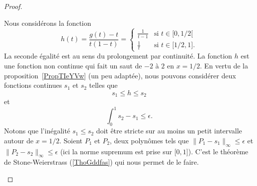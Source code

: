\begin{proof}
\begin{subproof}
		Nous considérons la fonction
		\begin{equation}
			h(t)=\frac{ g(t)-t }{ t(1-t) }=\begin{cases}
				\frac{1}{ t-1 } & \text{si } t\in \mathopen[ 0 , 1/2 [            \\
				\frac{1}{ t }   & \text{si } t\in \mathopen[ 1/2 , 1 \mathclose].
			\end{cases}
		\end{equation}
		La seconde égalité est au sens du prolongement par continuité. La fonction \( h\) est une fonction non continue qui fait un saut de \( -2\) à \( 2\) en \( x=1/2\). En vertu de la proposition~\ref{PropTIeYVw} (un peu adaptée), nous pouvons considérer deux fonctions continues \( s_1\) et \( s_2\) telles que
		\begin{equation}
			s_1\leq h\leq s_2
		\end{equation}
		et
		\begin{equation}
			\int_{0}^1s_2-s_1\leq \epsilon.
		\end{equation}
		Notons que l'inégalité \( s_1\leq s_2\) doit être stricte sur au moins un petit intervalle autour de \( x=1/2\). Soient \( P_1\) et \( P_2\), deux polynômes tels que \( \| P_1-s_1 \|_{\infty}\leq \epsilon\) et \( \| P_2-s_2 \|_{\infty}\leq \epsilon\) (ici la norme supremum est prise sur \( \mathopen[ 0 , 1 \mathclose]\)). C'est le théorème de Stone-Weierstrass (\ref{ThoGddfas}) qui nous permet de le faire.


\end{subproof}
\end{proof}
